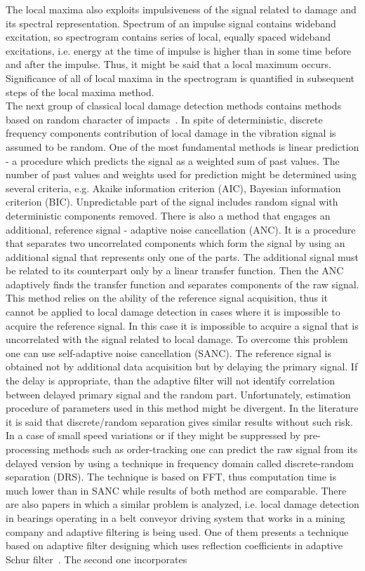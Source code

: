 \documentclass[3p,times]{elsarticle}
\begin{document}
The local maxima also exploits impulsiveness  of the signal related to damage and its spectral representation. Spectrum of an impulse signal contains wideband excitation, so spectrogram contains series of local, equally spaced wideband excitations, i.e. energy at the time of impulse is higher than in some time before and after the impulse. Thus, it might be said that a local maximum occurs. Significance of all of local maxima in the spectrogram is quantified in subsequent steps of the local maxima method.\\
The next group of classical local damage detection methods contains methods based on random character of impacts~\cite{bib19,bib20,bib26,bib27,ANCZhou,SANC1,SANC2,SANC3, SANC4,TSA1,DRS}. In spite of deterministic, discrete frequency components contribution of local damage in the vibration signal is assumed to be random. One of the most fundamental methods is linear prediction - a procedure which predicts the signal as a weighted sum of past values. The number of past values and weights used for prediction might be determined using several criteria, e.g. Akaike information criterion (AIC), Bayesian information criterion (BIC). Unpredictable part of the signal includes random signal with deterministic components removed. There is also a method that engages an additional, reference signal - adaptive noise cancellation (ANC). It is a procedure that separates two uncorrelated components which form the signal by using an additional signal that represents only one of the parts. The additional signal must be related to its counterpart only by a linear transfer function. Then the ANC adaptively finds the transfer function and separates components of the raw signal. This method relies on the ability of the reference signal acquisition, thus it cannot be applied to local damage detection in cases where it is impossible to acquire the reference signal. In this case it is impossible to acquire a signal that is uncorrelated with the signal related to local damage. To overcome this problem one can use self-adaptive noise cancellation (SANC). The reference signal is obtained not by additional data acquisition but by delaying the primary signal. If the delay is appropriate, than the adaptive filter will not identify correlation between delayed primary signal and the random part. Unfortunately, estimation procedure of parameters used in this method might be divergent. In the literature it is said that discrete/random separation gives similar results without such risk. In a case of small speed variations or if they might be suppressed by pre-processing methods such as order-tracking one can predict the raw signal from its delayed version by using a technique in frequency domain called discrete-random separation (DRS). The technique is based on FFT, thus computation time is much lower than in SANC while results of both method are comparable. There are also papers in which a similar problem is analyzed, i.e. local damage detection in bearings operating in a belt conveyor driving system that works in a mining company and adaptive filtering is being used. One of them presents a technique based on adaptive filter designing which uses reflection coefficients in adaptive Schur filter~\cite{bib19}. The second one incorporates 
\end{document}
